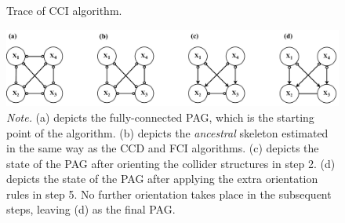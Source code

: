 \documentclass[twoside, 11pt]{article}
\newcommand{\circirc}{%
\begin{tikzpicture}[baseline=-3pt] 
    \draw [{Circle[open]}-{Circle[open]}] (0,0) -- (0.5, 0);
\end{tikzpicture}
}
\newcommand*{\figref}[2][]{%
  \hyperref[{fig:#2}]{%
    Figure~\ref*{fig:#2}%
    \ifx\\#1\\%
    \else
      #1%
    \fi
  }%
}
\begin{document}


\begin{figure}[!htbp]
    \centering
        \caption{Trace of CCI algorithm.}
        \includegraphics[width=1\textwidth]{figures/Fig8.pdf}
        \vspace{1mm}
        \caption*{\small{\textit{Note.} (a) depicts the fully-connected PAG, which is the starting point of the algorithm. (b) depicts the \textit{ancestral} skeleton estimated in the same way as the CCD and FCI algorithms. (c) depicts the state of the PAG after orienting the collider structures in step 2. (d) depicts the state of the PAG after applying the extra orientation rules in step 5. No further orientation takes place in the subsequent steps, leaving (d) as the final PAG.}}
    \label{fig:9}
\end{figure}
\end{document}
